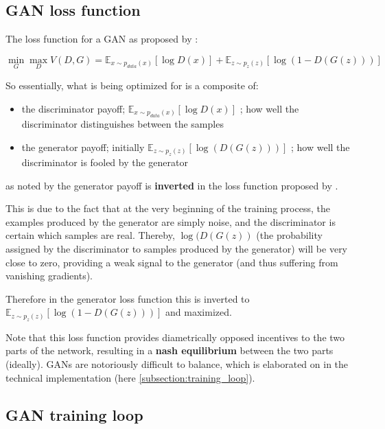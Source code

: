\pagebreak

\subsection{GAN loss function}

The loss function for a \ac{GAN} as proposed by \cite{goodfellow2014generative}:

$$\min_G \max_D V(D, G)=
\mathbb{E}_{x\sim p_{data}(x)}[\log D(x)]
+ \mathbb{E}_{z\sim p_z(z)}[\log(1 - D(G(z)))]$$

So essentially, what is being optimized for is a composite of:

\begin{itemize}
	\item the discriminator payoff; $\mathbb{E}_{x\sim p_{data}(x)}[\log D(x)]$ ; how well the discriminator distinguishes between the samples
	\item the generator payoff; initially $\mathbb{E}_{z\sim p_z(z)}[\log(D(G(z)))]$ ; how well the discriminator is fooled by the generator
\end{itemize}

as noted by \cite{raschka2017python} the generator payoff is \textbf{inverted} in the loss function proposed by \cite{goodfellow2014generative}. 

This is due to the fact that at the very beginning of the training process, the examples produced by the generator are simply noise, and the discriminator is certain which samples are real. Thereby, $\log(D(G(z))$ (the probability assigned by the discriminator to samples produced by the generator) will be very close to zero, providing a weak signal to the generator (and thus suffering from vanishing gradients). 

Therefore in the generator loss function this is inverted to $\mathbb{E}_{z\sim p_z(z)}[\log(1 - D(G(z)))]$ and maximized.

Note that this loss function provides diametrically opposed incentives to the two parts of the network, resulting in a \textbf{nash equilibrium} between the two parts (ideally).
\acp{GAN} are notoriously difficult to balance, which is elaborated on in the technical implementation (here \ref{subsection:training_loop}).

\pagebreak

\subsection{GAN training loop}

